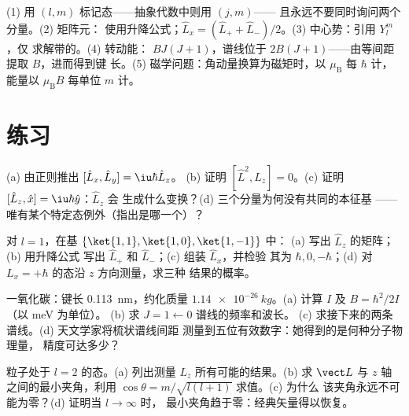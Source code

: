\begin{method}[角动量的实际应用]\label{met:b3:quantum-angular-momentum:method}
(1) 用 $(l, m)$ 标记态——抽象代数中则用 $(j, m)$——
且永远不要同时询问两个分量。(2) 矩阵元：
使用升降公式；$\hat L_x = (\hat L_+ + \hat
L_-)/2$。(3) 中心势：引用 $Y_l^m$，仅
求解带的。(4) 转动能：
$BJ(J+1)$，谱线位于 $2B(J+1)$——由等间距提取 $B$，进而得到键
长。(5) 磁学问题：角动量换算为磁矩时，以
$\mu_{\text{B}}$ 每 $\hbar$ 计，能量以
$\mu_{\text{B}}B$ 每单位 $m$ 计。
\end{method}

\section{练习}

\begin{exercise}[$\star$]\label{exo:b3:quantum-angular-momentum:1}
(a) 由正则推出 $[\hat L_x, \hat L_y] = \iu\hbar\hat L_z$。
(b) 证明 $[\hat L^2, \hat L_z] = 0$。(c) 证明
$[\hat L_z, \hat x] = \iu\hbar\hat y$：$\hat L_z$ 会
生成什么变换？(d) 三个分量为何没有共同的本征基
——唯有某个特定态例外（指出是哪一个）？
\end{exercise}

\begin{exercise}[$\star$]\label{exo:b3:quantum-angular-momentum:2}
对 $l = 1$，在基 $\{\ket{1,1}, \ket{1,0}, \ket{1,-1}\}$ 中：
(a) 写出 $\hat L_z$ 的矩阵；(b) 用升降公式
写出 $\hat L_+$ 和 $\hat L_-$；(c) 组装 $\hat L_x$，并检验
其为 $\hbar, 0, -\hbar$；(d) 对 $L_x =
+\hbar$ 的态沿 $z$ 方向测量，求三种
结果的概率。
\end{exercise}

\begin{exercise}[$\star$]\label{exo:b3:quantum-angular-momentum:3}
一氧化碳：键长 \qty{0.113}{nm}，约化质量
$\qty{1.14e-26}{kg}$。(a) 计算 $I$ 及 $B = \hbar^2/2I$（以 meV 为单位）。
(b) 求 $J = 1 \leftarrow 0$ 谱线的频率和波长。
(c) 求接下来的两条谱线。(d) 天文学家将梳状谱线间距
测量到五位有效数字：她得到的是何种分子物理量，
精度可达多少？
\end{exercise}

\begin{exercise}[$\star$]\label{exo:b3:quantum-angular-momentum:4}
粒子处于 $l = 2$ 的态。(a) 列出测量
$L_z$ 所有可能的结果。(b) 求 $\vect L$ 与
$z$ 轴之间的最小夹角，利用 $\cos\theta = m/\sqrt{l(l+1)}$ 求值。(c) 为什么
该夹角永远不可能为零？(d) 证明当 $l \to \infty$ 时，
最小夹角趋于零：经典矢量得以恢复。
\end{exercise}

